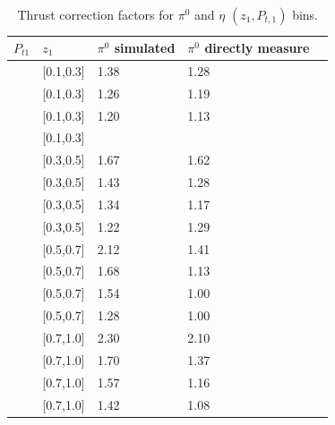 \begin{table}[H]\footnotesize
\centering
\begin{tabular}{|l|l|l|l|l|}
\hline
$P_{t1}$  & $z_{1}$ &  $\pi^0$ simulated  & $\pi^0$ directly measure   \\ \hline
[0,0.15] & [0.1,0.3]	&	1.38	&	1.28	\\ \hline
[0.15,0.3] & [0.1,0.3] 	&	1.26	&	1.19	\\ \hline
[0.3,0.5]  & [0.1,0.3] 	&	1.20	&	1.13	\\ \hline
[0.5,3] & [0.1,0.3]  	&		&		\\ \hline
[0,0.15] & [0.3,0.5]	&	1.67	&	1.62	\\ \hline
[0.15,0.3] & [0.3,0.5] 	&	1.43	&	1.28	\\ \hline
[0.3,0.5] & [0.3,0.5] 	&	1.34	&	1.17	\\ \hline
[0.5,3.0] & [0.3,0.5] 	&	1.22	&	1.29	\\ \hline
[0,0.15] & [0.5,0.7] 	&	2.12	&	1.41	\\ \hline
[0.15,0.3] & [0.5,0.7] 	&	1.68	&	1.13	\\ \hline
[0.3,0.5] & [0.5,0.7]  	&	1.54	&	1.00	\\ \hline
[0.5,3.0] & [0.5,0.7]  	&	1.28	&	1.00	\\ \hline
[0,0.15] & [0.7,1.0]	&	2.30	&	2.10	\\ \hline
[0.15,0.5]   & [0.7,1.0] 	&	1.70	&	1.37	\\ \hline
[0.3,0.5]  & [0.7,1.0] 	&	1.57	&	1.16	\\ \hline
[0.5,3.0] & [0.7,1.0]	&	1.42	&	1.08	\\ \hline
\end{tabular}
\caption{Thrust correction factors for $\pi^0$ and $\eta$ $(z_1,P_{t,1})$ bins.}
\label{tab:16binsthrustfactor_compare}
\end{table}


